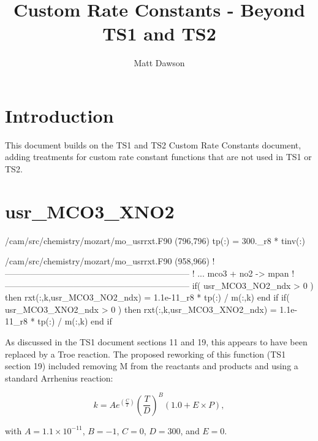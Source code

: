 \documentclass[titlepage]{article}
\begin{document}
\title{Custom Rate Constants - Beyond TS1 and TS2}
\author{Matt Dawson}
\maketitle


\section{Introduction}

This document builds on the TS1 and TS2 Custom Rate Constants document, adding treatments for custom rate constant
functions that are not used in TS1 or TS2.



\section{usr\_MCO3\_XNO2}

\begin{blockcode}[commandchars=\\\{\}]
\color{gray}/cam/src/chemistry/mozart/mo_usrrxt.F90 (796,796)
       tp(:)             = 300._r8 * tinv(:)
\end{blockcode}       
\begin{blockcode}[commandchars=\\\{\}]
\color{gray}/cam/src/chemistry/mozart/mo_usrrxt.F90 (958,966)
!-----------------------------------------------------------------
!     ... mco3 + no2 -> mpan
!-----------------------------------------------------------------
       if( usr_MCO3_NO2_ndx > 0 ) then
          rxt(:,k,usr_MCO3_NO2_ndx) = 1.1e-11_r8 * tp(:) / m(:,k)
       end if
       if( usr_MCO3_XNO2_ndx > 0 ) then
          rxt(:,k,usr_MCO3_XNO2_ndx) = 1.1e-11_r8 * tp(:) / m(:,k)
       end if
\end{blockcode}

As discussed in the TS1 document sections 11 and 19, this appears to have been replaced
by a Troe reaction. The proposed reworking of this function (TS1 section 19) included
removing M from the reactants and products and using a standard Arrhenius reaction:

\begin{equation}
k = Ae^{(\frac{C}{T})}(\frac{T}{D})^B(1.0+E \times P),
\end{equation}

\noindent with $A = 1.1 \times 10^{-11}$, $B = -1$, $C = 0$, $D = 300$, and $E = 0$.
\end{document}
